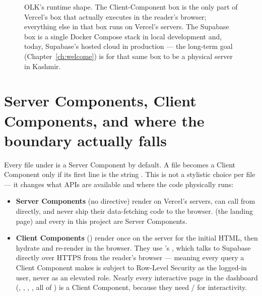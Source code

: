 \begin{figure}[h]
\caption{OLK's runtime shape. The Client-Component box is the only part of Vercel's box that actually executes in the reader's browser; everything else in that box runs on Vercel's servers. The Supabase box is a single Docker Compose stack in local development and, today, Supabase's hosted cloud in production — the long-term goal (Chapter~\ref{ch:welcome}) is for that same box to be a physical server in Kashmir.}
\label{fig:architecture}
\end{figure}

\section{Server Components, Client Components, and where the boundary actually falls}

Every file under  is a Server Component by default. A file becomes a Client Component only if its first line is the string . This is not a stylistic choice per file — it changes what APIs are available and where the code physically runs:

\begin{itemize}
  \item \textbf{Server Components} (no directive) render on Vercel's servers, can call  from  directly, and never ship their data-fetching code to the browser.  (the landing page) and every  in this project are Server Components.
  \item \textbf{Client Components} () render once on the server for the initial HTML, then hydrate and re-render in the browser. They use 's , which talks to Supabase directly over HTTPS from the reader's browser — meaning every query a Client Component makes is subject to Row-Level Security as the logged-in user, never as an elevated role. Nearly every interactive page in the dashboard (, , , , all of ) is a Client Component, because they need / for interactivity.
\end{itemize}

